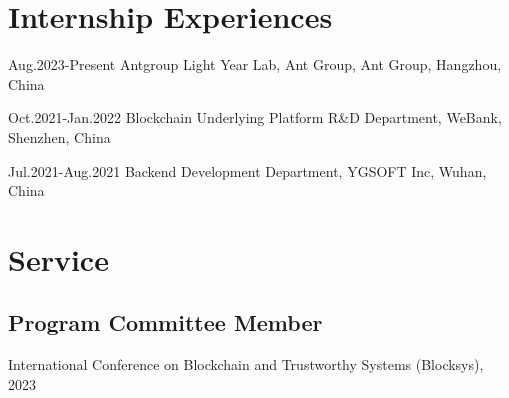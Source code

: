 \documentclass[12pt,letterpaper]{report}
\newcommand{\listitemspace}{0.25em}
\renewenvironment{itemize}
{\begin{list}{}{\setlength{\leftmargin}{0em}
                \setlength{\parskip}{0em}
                \setlength{\itemsep}{\listitemspace}
                \setlength{\parsep}{\listitemspace}}}
{\end{list}}
\begin{document}
    \section*{Internship Experiences}
    \begin{tablist}
        \item[Aug.2023-Present] \tab{}Antgroup Light Year Lab, Ant Group, Ant Group, Hangzhou, China
        \item[Oct.2021-Jan.2022] \tab{}Blockchain Underlying Platform R\&D Department, WeBank, Shenzhen, China
        \item[Jul.2021-Aug.2021] \tab{}Backend Development Department, YGSOFT Inc, Wuhan, China
    \end{tablist}


    \section*{Service}
    \subsection*{Program Committee Member}
    \begin{itemize}
        \item International Conference on Blockchain and Trustworthy Systems (Blocksys), 2023
    \end{itemize}
\end{document}
